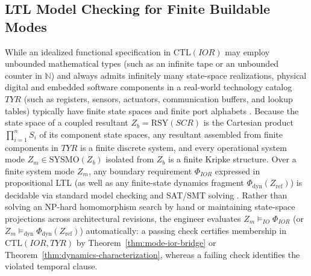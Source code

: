 \subsection{LTL Model Checking for Finite Buildable Modes}
\label{sec:ltl-decidability}
While an idealized functional specification in $\mathrm{CTL}(IOR)$ may employ unbounded mathematical types (such as an infinite tape or an unbounded counter in $\mathbb{N}$) and always admits infinitely many state-space realizations, physical digital and embedded software components in a real-world technology catalog $TYR$ (such as registers, sensors, actuators, communication buffers, and lookup tables) typically have finite state spaces and finite port alphabets \citep{Wymore1993,BurchClarkeMcMillanDill1992,BaierKatoen2008}. Because the state space of a coupled resultant $Z_b=\mathrm{RSY}(SCR)$ is the Cartesian product $\prod_{i=1}^n S_i$ of its component state spaces, any resultant assembled from finite components in $TYR$ is a finite discrete system, and every operational system mode $Z_m\in\mathrm{SYSMO}(Z_b)$ isolated from $Z_b$ is a finite Kripke structure. Over a finite system mode $Z_m$, any boundary requirement $\Phi_{IOR}$ expressed in propositional LTL (as well as any finite-state dynamics fragment $\Phi_{\mathrm{dyn}}(Z_{\mathrm{ref}})$) is decidable via standard model checking and SAT/SMT solving \citep{BaierKatoen2008,BiereCimattiClarkeZhu1999,deMouraZ32008}. Rather than solving an NP-hard homomorphism search by hand or maintaining state-space projections across architectural revisions, the engineer evaluates $Z_m\models_{IO}\Phi_{IOR}$ (or $Z_m\models_{\mathrm{dyn}}\Phi_{\mathrm{dyn}}(Z_{\mathrm{ref}})$) automatically: a passing check certifies membership in $\mathrm{CTL}(IOR,TYR)$ by Theorem~\ref{thm:mode-ior-bridge} or Theorem~\ref{thm:dynamics-characterization}, whereas a failing check identifies the violated temporal clause.
